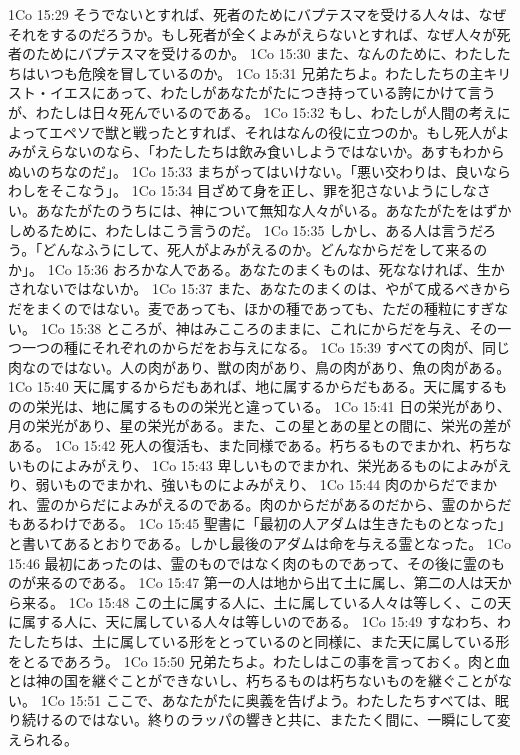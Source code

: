 1Co 15:29  そうでないとすれば、死者のためにバプテスマを受ける人々は、なぜそれをするのだろうか。もし死者が全くよみがえらないとすれば、なぜ人々が死者のためにバプテスマを受けるのか。
1Co 15:30  また、なんのために、わたしたちはいつも危険を冒しているのか。
1Co 15:31  兄弟たちよ。わたしたちの主キリスト・イエスにあって、わたしがあなたがたにつき持っている誇にかけて言うが、わたしは日々死んでいるのである。
1Co 15:32  もし、わたしが人間の考えによってエペソで獣と戦ったとすれば、それはなんの役に立つのか。もし死人がよみがえらないのなら、「わたしたちは飲み食いしようではないか。あすもわからぬいのちなのだ」。
1Co 15:33  まちがってはいけない。「悪い交わりは、良いならわしをそこなう」。
1Co 15:34  目ざめて身を正し、罪を犯さないようにしなさい。あなたがたのうちには、神について無知な人々がいる。あなたがたをはずかしめるために、わたしはこう言うのだ。
1Co 15:35  しかし、ある人は言うだろう。「どんなふうにして、死人がよみがえるのか。どんなからだをして来るのか」。
1Co 15:36  おろかな人である。あなたのまくものは、死ななければ、生かされないではないか。
1Co 15:37  また、あなたのまくのは、やがて成るべきからだをまくのではない。麦であっても、ほかの種であっても、ただの種粒にすぎない。
1Co 15:38  ところが、神はみこころのままに、これにからだを与え、その一つ一つの種にそれぞれのからだをお与えになる。
1Co 15:39  すべての肉が、同じ肉なのではない。人の肉があり、獣の肉があり、鳥の肉があり、魚の肉がある。
1Co 15:40  天に属するからだもあれば、地に属するからだもある。天に属するものの栄光は、地に属するものの栄光と違っている。
1Co 15:41  日の栄光があり、月の栄光があり、星の栄光がある。また、この星とあの星との間に、栄光の差がある。
1Co 15:42  死人の復活も、また同様である。朽ちるものでまかれ、朽ちないものによみがえり、
1Co 15:43  卑しいものでまかれ、栄光あるものによみがえり、弱いものでまかれ、強いものによみがえり、
1Co 15:44  肉のからだでまかれ、霊のからだによみがえるのである。肉のからだがあるのだから、霊のからだもあるわけである。
1Co 15:45  聖書に「最初の人アダムは生きたものとなった」と書いてあるとおりである。しかし最後のアダムは命を与える霊となった。
1Co 15:46  最初にあったのは、霊のものではなく肉のものであって、その後に霊のものが来るのである。
1Co 15:47  第一の人は地から出て土に属し、第二の人は天から来る。
1Co 15:48  この土に属する人に、土に属している人々は等しく、この天に属する人に、天に属している人々は等しいのである。
1Co 15:49  すなわち、わたしたちは、土に属している形をとっているのと同様に、また天に属している形をとるであろう。
1Co 15:50  兄弟たちよ。わたしはこの事を言っておく。肉と血とは神の国を継ぐことができないし、朽ちるものは朽ちないものを継ぐことがない。
1Co 15:51  ここで、あなたがたに奥義を告げよう。わたしたちすべては、眠り続けるのではない。終りのラッパの響きと共に、またたく間に、一瞬にして変えられる。
